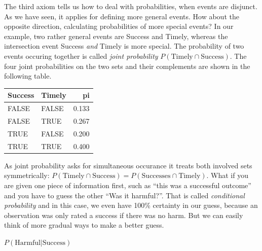 \documentclass[]{svmono}
\newenvironment{Shaded}{\begin{snugshade}}{\end{snugshade}}
\newcommand{\KeywordTok}[1]{\textcolor[rgb]{0.13,0.29,0.53}{\textbf{#1}}}
\newcommand{\DataTypeTok}[1]{\textcolor[rgb]{0.13,0.29,0.53}{#1}}
\newcommand{\StringTok}[1]{\textcolor[rgb]{0.31,0.60,0.02}{#1}}
\newcommand{\OperatorTok}[1]{\textcolor[rgb]{0.81,0.36,0.00}{\textbf{#1}}}
\newcommand{\NormalTok}[1]{#1}
\theoremstyle{definition}
\theoremstyle{definition}
\theoremstyle{definition}
\theoremstyle{remark}
\begin{document}
The third axiom tells us how to deal with probabilities, when events are
disjunct. As we have seen, it applies for defining more general events.
How about the opposite direction, calculating probabilities of more
special events? In our example, two rather general events are Success
and Timely, whereas the intersection event Success \emph{and} Timely is
more special. The probability of two events occuring together is called
\emph{joint probability} \(P(\textrm{Timely} \cap \textrm{Success})\).
The four joint probabilities on the two sets and their complements are
shown in the following table.

\begin{Shaded}
\end{Shaded}

\begin{tabular}{l|l|r}
\hline
Success & Timely & pi\\
\hline
FALSE & FALSE & 0.133\\
\hline
FALSE & TRUE & 0.267\\
\hline
TRUE & FALSE & 0.200\\
\hline
TRUE & TRUE & 0.400\\
\hline
\end{tabular}

As joint probability asks for simultaneous occurance it treats both
involved sets symmetrically:
\(P(\textrm{Timely} \cap \textrm{Success}) = P(\textrm{Successes} \cap \textrm{Timely})\).
What if you are given one piece of information first, such as ``this was
a successful outcome'' and you have to guess the other ``Was it
harmful?''. That is called \emph{conditional probability} and in this
case, we even have 100\% certainty in our guess, because an observation
was only rated a success if there was no harm. But we can easily think
of more gradual ways to make a better guess.

\(P(\textrm{Harmful}|\textrm{Success})\)

\begin{Shaded}
\end{Shaded}
\end{document}
